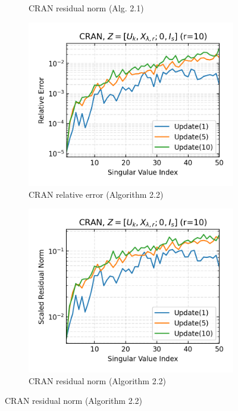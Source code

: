 \begin{figure}[H]
\begin{subfigure}[b]{0.48\textwidth}
    \caption{CRAN residual norm (Alg. 2.1)}
  \end{subfigure}
  \hfill
  \begin{subfigure}[b]{0.48\textwidth}
    \centering
    \includegraphics[width=\textwidth]{figures/cran/CRAN_bcg_n_batches_10_k_dims_50_rval_10_rel_err.png}
    \caption{CRAN relative error (Algorithm 2.2)}
  \end{subfigure}
  \hfill
  \begin{subfigure}[b]{0.48\textwidth}
    \centering
    \includegraphics[width=\textwidth]{figures/cran/CRAN_bcg_n_batches_10_k_dims_50_rval_10_res_norm.png}
    \caption{CRAN residual norm (Algorithm 2.2)}

\end{subfigure}
\end{figure}
